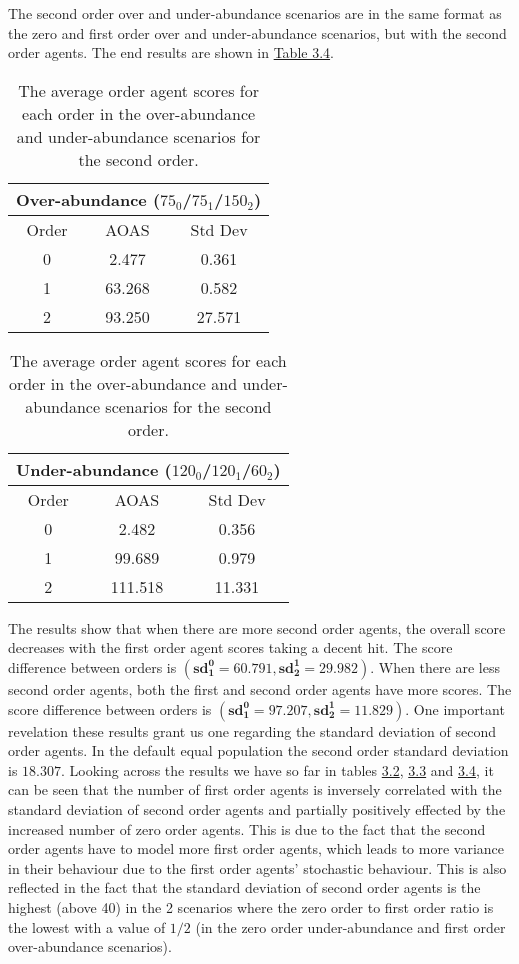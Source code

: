 The second order over and under-abundance scenarios are in the same format as the zero and first order over and under-abundance scenarios, but with the second order agents. The end results are shown in \hyperref[table:non-sig-second-order-simple]{Table 3.4}.

\begin{table}[h]
\centering
\begin{tabular}{|c|c|c|}
\hline
\multicolumn{3}{|c|}{Over-abundance ($75_{0}$/$75_{1}$/$150_{2}$)} \\
\hline
Order & AOAS & Std Dev \\
\hline
0     & 2.477   & 0.361    \\
1     & 63.268  & 0.582    \\
2     & 93.250  & 27.571   \\
\hline
\end{tabular}
\qquad
\begin{tabular}{|c|c|c|}
\hline
\multicolumn{3}{|c|}{Under-abundance ($120_{0}$/$120_{1}$/$60_{2}$)} \\
\hline
Order & AOAS & Std Dev \\
\hline
0     & 2.482   & 0.356   \\
1     & 99.689  & 0.979  \\
2     & 111.518 & 11.331 \\
\hline
\end{tabular}
\caption{The average order agent scores for each order in the over-abundance and under-abundance scenarios for the second order.}
\label{table:non-sig-second-order-simple}
\end{table}

The results show that when there are more second order agents, the overall score decreases with the first order agent scores taking a decent hit. The score difference between orders is $(\mathbf{sd^0_1 = 60.791}, \mathbf{sd^1_2 = 29.982})$. When there are less second order agents, both the first and second order agents have more scores. The score difference between orders is $(\mathbf{sd^0_1 = 97.207}, \mathbf{sd^1_2 = 11.829})$. One important revelation these results grant us one regarding the standard deviation of second order agents. In the default equal population the second order standard deviation is $\mathbf{18.307}$. Looking across the results we have so far in tables \hyperref[table:non-sig-zero-order-simple]{3.2}, \hyperref[table:non-sig-first-order-simple]{3.3} and \hyperref[table:non-sig-second-order-simple]{3.4}, it can be seen that the number of first order agents is inversely correlated with the standard deviation of second order agents and partially positively effected by the increased number of zero order agents. This is due to the fact that the second order agents have to model more first order agents, which leads to more variance in their behaviour due to the first order agents' stochastic behaviour. This is also reflected in the fact that the standard deviation of second order agents is the highest (above 40) in the 2 scenarios where the zero order to first order ratio is the lowest with a value of $1/2$ (in the zero order under-abundance and first order over-abundance scenarios). 